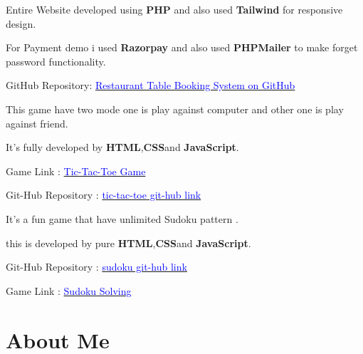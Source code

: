 \documentclass{deedy-resume-openfont}
\begin{document}
\begin{minipage}[t]{0.66\textwidth}
\begin{tightemize}
\item Entire Website developed using  \textbf{PHP} and also used \textbf{Tailwind} for responsive design.
\item  For Payment demo i used \textbf{Razorpay} and also used \textbf{PHPMailer} to make forget password functionality.
\item GitHub Repository: \href{https://github.com/RudraSarkar5/Restaurant_Booking_System_In_Php}{\textcolor{blue}{Restaurant Table Booking System on GitHub}}

\end{tightemize}
\sectionsep



\begin{tightemize}
\item This game have two mode one is play against computer and other one is play against friend.
\item It's fully developed by \textbf{HTML},\textbf{CSS}and \textbf{JavaScript}.

\item Game Link :
\href{ https://rudrasarkar5.github.io/tic-tac-toe/}{\textcolor{blue}{Tic-Tac-Toe Game}}
\item Git-Hub Repository :
\href{https://github.com/RudraSarkar5/tic-tac-toe.git}{\textcolor{blue}{tic-tac-toe git-hub link}}

\end{tightemize}
\sectionsep


\begin{tightemize}
\item It's a fun game that have unlimited Sudoku pattern .
\item this is developed by pure \textbf{HTML},\textbf{CSS}and \textbf{JavaScript}.


\item Git-Hub Repository :
\href{https://github.com/RudraSarkar5/Sudoku}{\textcolor{blue}{sudoku git-hub link}}
\item Game Link :
\href{https://rudrasarkar5.github.io/Sudoku/}{\textcolor{blue}{Sudoku Solving}}

\end{tightemize}
\sectionsep






\section{About Me} 
\vspace{\topsep} %
\begin{tightemize}


\end{tightemize}
\end{minipage}
\end{document}
